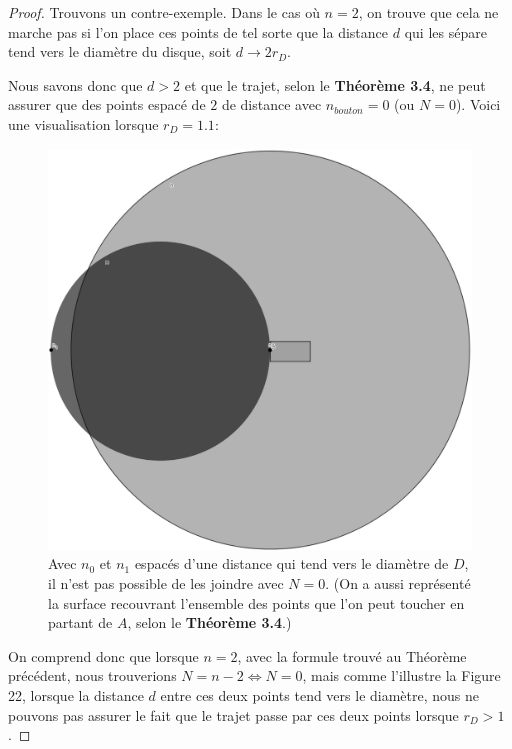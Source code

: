 \documentclass{amsart}
\theoremstyle{definition}
\theoremstyle{remark}
\numberwithin{equation}{section}
\begin{document}
\begin{proof}
  Trouvons un contre-exemple. Dans le cas où $n=2$, on trouve que cela ne marche pas si l'on place ces points de tel sorte que la distance $d$ qui les sépare tend vers le diamètre du disque, soit $d\to2r_D$.

  Nous savons donc que $d>2$ et que le trajet, selon le \textbf{Théorème 3.4}, ne peut assurer que des points espacé de $2$ de distance avec $n_{bouton}=0$ (ou $N=0$). Voici une visualisation lorsque $r_D=1.1$:

  \begin{figure}[H]
    \centering
    \includegraphics[scale=0.2]{images/q3_not_possible.png}
    \caption{Avec $n_0$ et $n_1$ espacés d'une distance qui tend vers le diamètre de $D$, il n'est pas possible de les joindre avec $N=0$. (On a aussi représenté la surface recouvrant l'ensemble des points que l'on peut toucher en partant de $A$, selon 
    le \textbf{Théorème 3.4}.)}
  \end{figure}

  On comprend donc que lorsque $n=2$, avec la formule trouvé au Théorème précédent, nous trouverions $N=n-2\Leftrightarrow N=0$, mais comme l'illustre la Figure 22, lorsque la distance $d$ entre ces deux points tend vers le diamètre, nous ne pouvons pas assurer
  le fait que le trajet passe par ces deux points lorsque $r_D>1$.
\end{proof}
\end{document}

